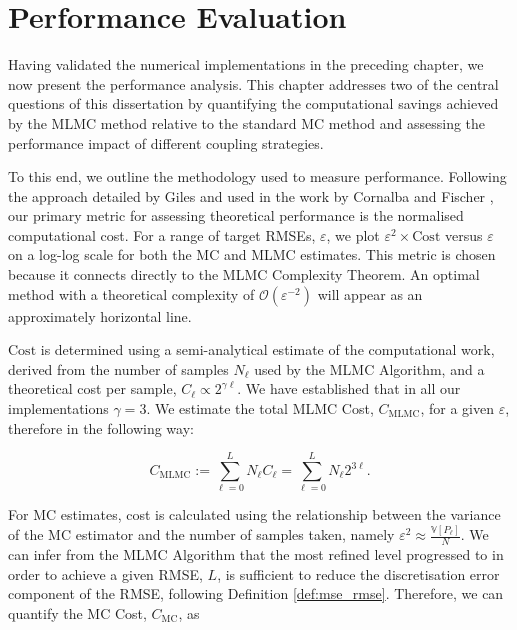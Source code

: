 \chapter{Performance Evaluation}\label{chap:performance}

Having validated the numerical implementations in the preceding chapter, 
we now present the performance analysis. This chapter addresses 
two of the central questions of this dissertation by quantifying 
the computational savings achieved by the MLMC method relative to the 
standard MC method and assessing the performance 
impact of different coupling strategies.

To this end, we outline the methodology used to measure 
performance. Following the approach detailed by Giles \cite{giles2015multilevel}
and used in the work by Cornalba 
and Fischer \cite{cornalba2025multilevel}, our primary metric for assessing 
theoretical performance is the normalised computational cost. For a range of 
target RMSEs, $\varepsilon$, we plot $\varepsilon^2 \times \mathrm{Cost}$
versus $\varepsilon$ on a log-log scale for both the MC and MLMC estimates. 
This metric is chosen because it 
connects directly to the MLMC Complexity Theorem. An optimal method 
with a theoretical complexity of $\mathcal{O}(\varepsilon^{-2})$ 
will appear as an approximately horizontal line.

$\mathrm{Cost}$ is determined using a semi-analytical estimate of the computational
work, derived from the number of samples $N_\ell$ used by the 
MLMC Algorithm, and a theoretical cost per sample, $C_\ell \propto 2^{\gamma \ell}$.
We have established that in all our implementations $\gamma = 3$.
We estimate the total MLMC Cost, $C_{\mathrm{MLMC}}$, for a given 
$\varepsilon$, therefore in the following way:

\begin{equation*}
    C_{\mathrm{MLMC}} := \sum_{\ell = 0}^L N_\ell C_\ell = \sum_{\ell = 0}^L N_\ell 2^{3\ell}.
\end{equation*}

For MC estimates, cost is calculated using the relationship between the
variance of the MC estimator and the number of samples taken, namely
$\varepsilon^2 \approx \frac{\mathbb{V}[P_\ell]}{N}$. We can infer 
from the MLMC Algorithm that the most refined level progressed to in order 
to achieve a given RMSE, $L$, 
is sufficient to reduce the discretisation error component of the RMSE, 
following Definition \ref{def:mse_rmse}. Therefore, we can quantify 
the MC Cost, $C_{\mathrm{MC}}$, as


